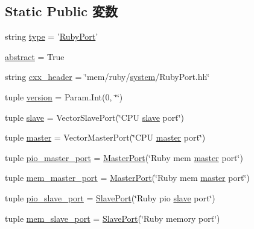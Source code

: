 \subsection*{Static Public 変数}
\begin{DoxyCompactItemize}
\item 
string \hyperlink{classSequencer_1_1RubyPort_acce15679d830831b0bbe8ebc2a60b2ca}{type} = '\hyperlink{classSequencer_1_1RubyPort}{RubyPort}'
\item 
\hyperlink{classSequencer_1_1RubyPort_a17fa61ac3806b481cafee5593b55e5d0}{abstract} = True
\item 
string \hyperlink{classSequencer_1_1RubyPort_a17da7064bc5c518791f0c891eff05fda}{cxx\_\-header} = \char`\"{}mem/ruby/\hyperlink{classSequencer_1_1RubyPort_ab737471139f5a296e5b26e8a0e1b0744}{system}/RubyPort.hh\char`\"{}
\item 
tuple \hyperlink{classSequencer_1_1RubyPort_a76aa01cd80eeb03b381ebe36f17c16b2}{version} = Param.Int(0, \char`\"{}\char`\"{})
\item 
tuple \hyperlink{classSequencer_1_1RubyPort_a9b8cb1f697e86858437a78f041478c9b}{slave} = VectorSlavePort(\char`\"{}CPU \hyperlink{classSequencer_1_1RubyPort_a9b8cb1f697e86858437a78f041478c9b}{slave} port\char`\"{})
\item 
tuple \hyperlink{classSequencer_1_1RubyPort_a0f74d64e6817f0f89bafc52ff3c56cbb}{master} = VectorMasterPort(\char`\"{}CPU \hyperlink{classSequencer_1_1RubyPort_a0f74d64e6817f0f89bafc52ff3c56cbb}{master} port\char`\"{})
\item 
tuple \hyperlink{classSequencer_1_1RubyPort_a63d83b93705d8e98024b0cf901f52f75}{pio\_\-master\_\-port} = \hyperlink{classMasterPort}{MasterPort}(\char`\"{}Ruby mem \hyperlink{classSequencer_1_1RubyPort_a0f74d64e6817f0f89bafc52ff3c56cbb}{master} port\char`\"{})
\item 
tuple \hyperlink{classSequencer_1_1RubyPort_a2dd7c1b9852261e71c99dba4668ebcf8}{mem\_\-master\_\-port} = \hyperlink{classMasterPort}{MasterPort}(\char`\"{}Ruby mem \hyperlink{classSequencer_1_1RubyPort_a0f74d64e6817f0f89bafc52ff3c56cbb}{master} port\char`\"{})
\item 
tuple \hyperlink{classSequencer_1_1RubyPort_a82316b5d33f337f8528f5514c9a2d7ab}{pio\_\-slave\_\-port} = \hyperlink{classSlavePort}{SlavePort}(\char`\"{}Ruby pio \hyperlink{classSequencer_1_1RubyPort_a9b8cb1f697e86858437a78f041478c9b}{slave} port\char`\"{})
\item 
tuple \hyperlink{classSequencer_1_1RubyPort_af0bfd7c0d08a39ab402b0542b759f474}{mem\_\-slave\_\-port} = \hyperlink{classSlavePort}{SlavePort}(\char`\"{}Ruby memory port\char`\"{})

\end{DoxyCompactItemize}
